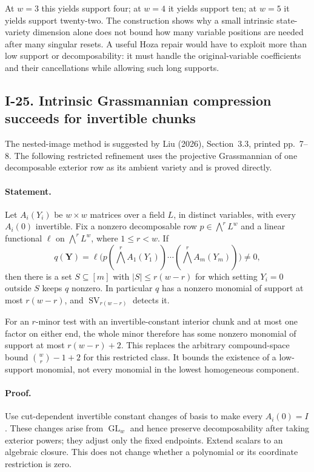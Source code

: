 At $w=3$ this yields support four; at $w=4$ it yields support
ten; at $w=5$ it yields support twenty-two.  The construction
shows why a small intrinsic state-variety dimension alone does
not bound how many variable positions are needed after many
singular resets.  A useful Hoza repair would have to exploit
more than low support or decomposability: it must handle the
original-variable coefficients and their cancellations while
allowing such long supports.


\subsection{I-25. Intrinsic Grassmannian compression succeeds for invertible chunks}
\label{I-25}

The nested-image method is suggested by Liu (2026), Section~3.3,
printed pp.~7--8.  The following restricted refinement uses
the projective Grassmannian of one decomposable exterior row
as its ambient variety and is proved directly.

\paragraph{Statement.}
Let $A_i(Y_i)$ be $w\times w$ matrices over a field $L$, in
distinct variables, with every $A_i(0)$ invertible.  Fix a
nonzero decomposable row $p\in\bigwedge^r L^w$ and a linear
functional $\ell$ on $\bigwedge^rL^w$, where $1\le r<w$.
If
\[
 q(\mathbf Y)=\ell\bigl(p(\textstyle\bigwedge^r A_1(Y_1))
                  \cdots(\textstyle\bigwedge^r A_m(Y_m))\bigr)
 \ne0,
\]
then there is a set $S\subseteq[m]$ with
$|S|\le r(w-r)$ for which setting $Y_i=0$ outside $S$
keeps $q$ nonzero.  In particular $q$ has a nonzero monomial
of support at most $r(w-r)$, and $\operatorname{SV}_{r(w-r)}$
detects it.

For an $r$-minor test with an invertible-constant interior
chunk and at most one factor on either end, the whole minor
therefore has some nonzero monomial of support at most
$r(w-r)+2$.  This replaces the arbitrary compound-space bound
$\binom wr-1+2$ for this restricted class.  It bounds the
existence of a low-support monomial, not every monomial in the
lowest homogeneous component.

\paragraph{Proof.}
Use cut-dependent invertible constant changes of basis to make
every $A_i(0)=I$.  These changes arise from $\operatorname{GL}_w$
and hence preserve decomposability after taking exterior powers;
they adjust only the fixed endpoints.  Extend scalars to an
algebraic closure.  This does not change whether a polynomial
or its coordinate restriction is zero.

